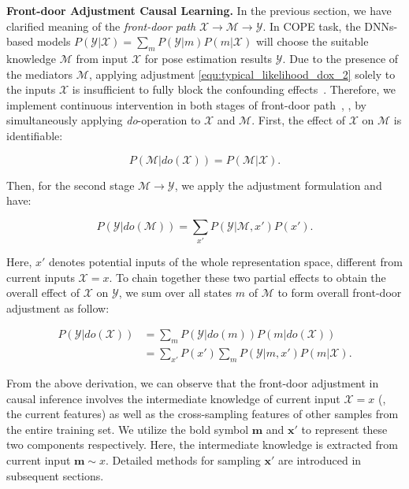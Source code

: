 \vspace{0.1cm}
\noindent
{\bf Front-door Adjustment Causal Learning.} In the previous section, we have clarified meaning of the \emph{front-door path} $\mathcal{X} \rightarrow \mathcal{M} \rightarrow \mathcal{Y}$. In COPE task, the DNNs-based models $P(\mathcal{Y}|\mathcal{X}) = \sum_{m}P(\mathcal{Y}|m)P(m|\mathcal{X})$ will choose the suitable knowledge $\mathcal{M}$ from input $\mathcal{X}$ for pose estimation results $\mathcal{Y}$.
Due to the presence of the mediators $\mathcal{M}$, applying adjustment \cref{equ:typical_likelihood_dox_2} solely to the inputs $\mathcal{X}$ is insufficient to fully block the confounding effects~\cite{wang2024vision}. Therefore, we implement continuous intervention in both stages of front-door path~\cite{pearl2016causal}, \ie, by simultaneously applying \emph{do}-operation to $\mathcal{X}$ and $\mathcal{M}$.
First, the effect of $\mathcal{X}$ on $\mathcal{M}$ is identifiable:
\begin{small}
\begin{equation}
\label{equ:x2m_do}
    P(\mathcal{M}|do(\mathcal{X})) = P(\mathcal{M}|\mathcal{X}).
\end{equation}
\end{small}
Then, for the second stage $\mathcal{M} \rightarrow \mathcal{Y}$, we apply the adjustment formulation and have:
\begin{small}
\begin{equation}
\label{equ:m2y_do}
    P(\mathcal{Y}|do(\mathcal{M})) = \sum_{x'}P(\mathcal{Y}|\mathcal{M}, x')P(x').
\end{equation}
\end{small}
Here, $x'$ denotes potential inputs of the whole representation space, different from current inputs $\mathcal{X} = x$. To chain together these two partial effects to obtain the overall effect of $\mathcal{X}$ on $\mathcal{Y}$, we sum over all states $m$ of $\mathcal{M}$ to form overall front-door adjustment as follow:
\begin{small}
\begin{align}
    P(\mathcal{Y}|do(\mathcal{X})) &= \sum_{m}P(\mathcal{Y}|do(m))P(m|do(\mathcal{X})) \label{equ:x2y_do_1} \\
    &= \sum_{x'}P(x')\sum_{m}P(\mathcal{Y}|m, x')P(m|\mathcal{X}) \label{equ:x2y_do_2}.
\end{align}
\end{small}
From the above derivation, we can observe that the front-door adjustment in causal inference involves the intermediate knowledge of current input $\mathcal{X} = x$ (\ie, the current features) as well as the cross-sampling features of other samples from the entire training set. We utilize the bold symbol $\boldsymbol{m}$ and $\boldsymbol{x'}$ to represent these two components respectively. Here, the intermediate knowledge is extracted from current input $\boldsymbol{m} \sim x$. Detailed methods for sampling $\boldsymbol{x'}$ are introduced in subsequent sections.


